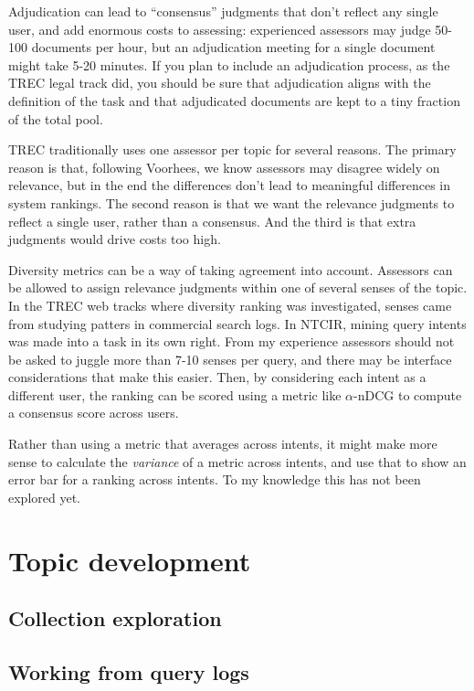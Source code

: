 \documentclass[nobib]{tufte-book}
\begin{document}
Adjudication can lead to ``consensus'' judgments that don't reflect any single user, and add enormous costs to assessing: experienced assessors may judge 50-100 documents per hour, but an adjudication meeting for a single document might take 5-20 minutes.  If you plan to include an adjudication process, as the TREC legal track did,\autocite{oard_evaluation_2010} you should be sure that adjudication aligns with the definition of the task and that adjudicated documents are kept to a tiny fraction of the total pool.

TREC traditionally uses one assessor per topic for several reasons.  The primary reason is that, following Voorhees\autocite{voorhees_variations_1998}, we know assessors may disagree widely on relevance, but in the end the differences don't lead to meaningful differences in system rankings.  The second reason is that we want the relevance judgments to reflect a single user, rather than a consensus.  And the third is that extra judgments would drive costs too high.

Diversity metrics can be a way of taking agreement into account.  Assessors can be allowed to assign relevance judgments within one of several senses of the topic.  In the TREC web tracks where diversity ranking was investigated, senses came from studying patters in commercial search logs.  In NTCIR, mining query intents was made into a task in its own right.\autocite{liu_overview_2014}  From my experience assessors should not be asked to juggle more than 7-10 senses per query, and there may be interface considerations that make this easier.  Then, by considering each intent as a different user, the ranking can be scored  using a metric like $\alpha$-nDCG\autocite{sakai_which_2019} to compute a consensus score across users.

Rather than using a metric that averages across intents, it might make more sense to calculate the {\em variance} of a metric across intents, and use that to show an error bar for a ranking across intents.  To my knowledge this has not been explored yet.

\chapter{Topic development} \label{topic-development}

\section{Collection exploration}
\section{Working from query logs}
\end{document}
